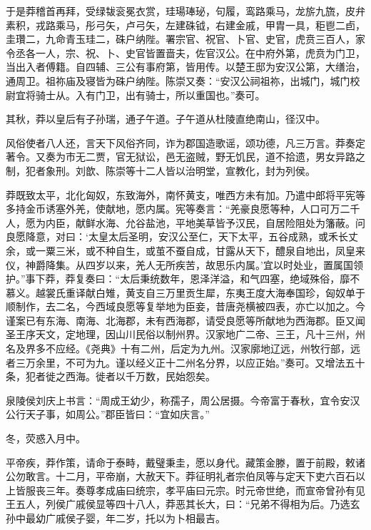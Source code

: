 \documentclass[12pt,UTF8]{ctexbook}
\begin{document}
于是莽稽首再拜，受绿韨衮冕衣赏，珪瑒琫珌，句履，鸾路乘马，龙旂九旒，皮弁素积，戎路乘马，彤弓矢，卢弓矢，左建硃钺，右建金戚，甲胄一具，秬鬯二卣，圭瓚二，九命青玉珪二，硃户纳陛。署宗官、祝官、卜官、史官，虎贲三百人，家令丞各一人，宗、祝、卜、史官皆置啬夫，佐官汉公。在中府外第，虎贲为门卫，当出入者傅籍。自四辅、三公有事府第，皆用传。以楚王邸为安汉公第，大缮治，通周卫。祖祢庙及寝皆为硃户纳陛。陈崇又奏：“安汉公祠祖祢，出城门，城门校尉宜将骑士从。入有门卫，出有骑士，所以重国也。”奏可。



其秋，莽以皇后有子孙瑞，通子午道。子午道从杜陵直绝南山，径汉中。



风俗使者八人还，言天下风俗齐同，诈为郡国造歌谣，颂功德，凡三万言。莽奏定著令。又奏为市无二贾，官无狱讼，邑无盗贼，野无饥民，道不拾遗，男女异路之制，犯者象刑。刘歆、陈崇等十二人皆以治明堂，宣教化，封为列侯。



莽既致太平，北化匈奴，东致海外，南怀黄支，唯西方未有加。乃遣中郎将平宪等多持金币诱塞外羌，使献地，愿内属。宪等奏言：“羌豪良愿等种，人口可万二千人，愿为内臣，献鲜水海、允谷盐池，平地美草皆予汉民，自居险阻处为籓蔽。问良愿降意，对曰：‘太皇太后圣明，安汉公至仁，天下太平，五谷成熟，或禾长丈余，或一粟三米，或不种自生，或茧不蚕自成，甘露从天下，醴泉自地出，凤皇来仪，神爵降集。从四岁以来，羌人无所疾苦，故思乐内属。’宜以时处业，置属国领护。”事下莽，莽复奏曰：“太后秉统数年，恩泽洋溢，和气四塞，绝域殊俗，靡不慕义。越裳氏重译献白雉，黄支自三万里贡生犀，东夷王度大海奉国珍，匈奴单于顺制作，去二名，今西域良愿等复举地为臣妾，昔唐尧横被四表，亦亡以加之。今谨案已有东海、南海、北海郡，未有西海郡，请受良愿等所献地为西海郡。臣又闻圣王序天文，定地理，因山川民俗以制州界。汉家地广二帝、三王，凡十三州，州名及界多不应经。《尧典》十有二州，后定为九州。汉家廓地辽远，州牧行部，远者三万余里，不可为九。谨以经义正十二州名分界，以应正始。”奏可。又增法五十条，犯者徙之西海。徙者以千万数，民始怨矣。



泉陵侯刘庆上书言：“周成王幼少，称孺子，周公居摄。今帝富于春秋，宜令安汉公行天子事，如周公。”郡臣皆曰：“宜如庆言。”



冬，荧惑入月中。



平帝疾，莽作策，请命于泰畤，戴璧秉圭，愿以身代。藏策金滕，置于前殿，敕诸公勿敢言。十二月，平帝崩，大赦天下。莽征明礼者宗伯凤等与定天下吏六百石以上皆服丧三年。奏尊孝成庙曰统宗，孝平庙曰元宗。时元帝世绝，而宣帝曾孙有见王五人，列侯广戚侯显等四十八人，莽恶其长大，曰：“兄弟不得相为后。乃选玄孙中最幼广戚侯子婴，年二岁，托以为卜相最吉。
\end{document}
